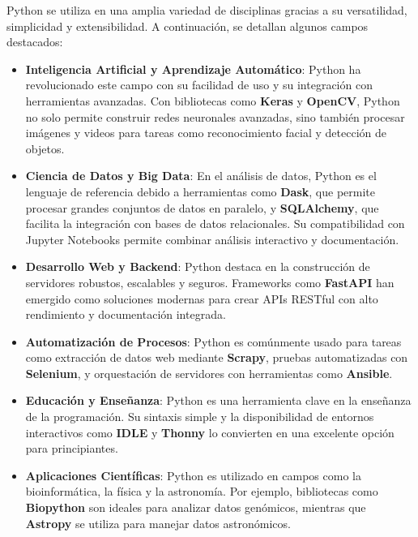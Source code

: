 \documentclass[conference]{IEEEtran}
\begin{document}
Python se utiliza en una amplia variedad de disciplinas gracias a su versatilidad, simplicidad y extensibilidad. A continuación, se detallan algunos campos destacados:  

\begin{itemize}
    \item \textbf{Inteligencia Artificial y Aprendizaje Automático}:  
    Python ha revolucionado este campo con su facilidad de uso y su integración con herramientas avanzadas. Con bibliotecas como \textbf{Keras} y \textbf{OpenCV}, Python no solo permite construir redes neuronales avanzadas, sino también procesar imágenes y videos para tareas como reconocimiento facial y detección de objetos.  

    \item \textbf{Ciencia de Datos y Big Data}:  
    En el análisis de datos, Python es el lenguaje de referencia debido a herramientas como \textbf{Dask}, que permite procesar grandes conjuntos de datos en paralelo, y \textbf{SQLAlchemy}, que facilita la integración con bases de datos relacionales. Su compatibilidad con Jupyter Notebooks permite combinar análisis interactivo y documentación.  

    \item \textbf{Desarrollo Web y Backend}:  
    Python destaca en la construcción de servidores robustos, escalables y seguros. Frameworks como \textbf{FastAPI} han emergido como soluciones modernas para crear APIs RESTful con alto rendimiento y documentación integrada.  

    \item \textbf{Automatización de Procesos}:  
    Python es comúnmente usado para tareas como extracción de datos web mediante \textbf{Scrapy}, pruebas automatizadas con \textbf{Selenium}, y orquestación de servidores con herramientas como \textbf{Ansible}.  

    \item \textbf{Educación y Enseñanza}:  
    Python es una herramienta clave en la enseñanza de la programación. Su sintaxis simple y la disponibilidad de entornos interactivos como \textbf{IDLE} y \textbf{Thonny} lo convierten en una excelente opción para principiantes.  

    \item \textbf{Aplicaciones Científicas}:  
    Python es utilizado en campos como la bioinformática, la física y la astronomía. Por ejemplo, bibliotecas como \textbf{Biopython} son ideales para analizar datos genómicos, mientras que \textbf{Astropy} se utiliza para manejar datos astronómicos.  
\end{itemize}
\end{document}

